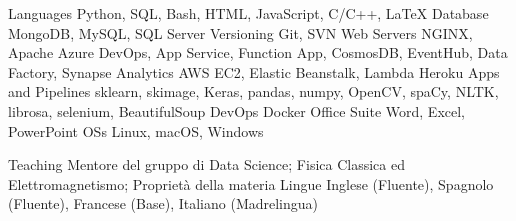 

\begin{cvskills}
  \cvskill
    {Languages}
    {Python, SQL, Bash, HTML, JavaScript, C/C++, LaTeX}
  \cvskill
    {Database}
    {MongoDB, MySQL, SQL Server}
  \cvskill
    {Versioning}
    {Git, SVN}
  \cvskill
    {Web Servers}
    {NGINX, Apache}
  \cvskill
    {Azure}
    {DevOps, App Service, Function App, CosmosDB, EventHub, Data Factory, Synapse Analytics}
  \cvskill
    {AWS}
    {EC2, Elastic Beanstalk, Lambda}
  \cvskill
    {Heroku}
    {Apps and Pipelines}
  {sklearn, skimage, Keras, pandas, numpy, OpenCV, spaCy, NLTK, librosa, selenium, BeautifulSoup}
  \cvskill
    {DevOps}
    {Docker}
  \cvskill
    {Office Suite}
    {Word, Excel, PowerPoint}
  \cvskill
    {OSs}
    {Linux, macOS, Windows}
\end{cvskills}





\begin{cvskills}
  \cvskill
    {Teaching}
    {Mentore del gruppo di Data Science; Fisica Classica ed Elettromagnetismo; Proprietà della materia}
  \cvskill
    {Lingue}
    {Inglese (Fluente), Spagnolo (Fluente), Francese (Base), Italiano (Madrelingua)}
\end{cvskills}
